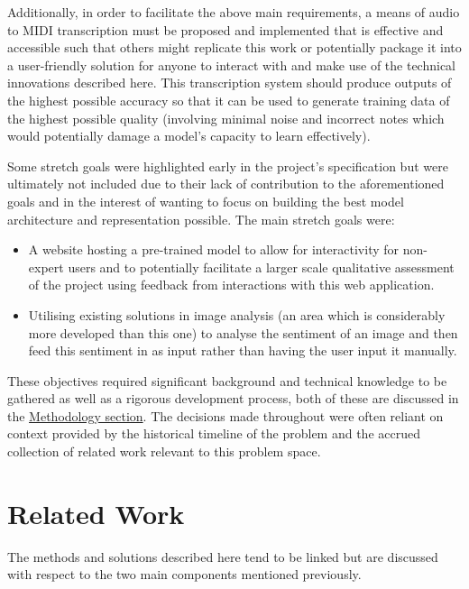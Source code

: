 \documentclass[12pt,]{article}
\providecommand{\tightlist}{%
  \setlength{\itemsep}{0pt}\setlength{\parskip}{0pt}}
\begin{document}
Additionally, in order to facilitate the above main requirements, a
means of audio to MIDI transcription must be proposed and implemented
that is effective and accessible such that others might replicate this
work or potentially package it into a user-friendly solution for anyone
to interact with and make use of the technical innovations described
here. This transcription system should produce outputs of the highest
possible accuracy so that it can be used to generate training data of
the highest possible quality (involving minimal noise and incorrect
notes which would potentially damage a model's capacity to learn
effectively).

Some stretch goals were highlighted early in the project's specification
but were ultimately not included due to their lack of contribution to
the aforementioned goals and in the interest of wanting to focus on
building the best model architecture and representation possible. The
main stretch goals were:

\begin{itemize}
\tightlist
\item
  A website hosting a pre-trained model to allow for interactivity for
  non-expert users and to potentially facilitate a larger scale
  qualitative assessment of the project using feedback from interactions
  with this web application.
\item
  Utilising existing solutions in image analysis (an area which is
  considerably more developed than this one) to analyse the sentiment of
  an image and then feed this sentiment in as input rather than having
  the user input it manually.
\end{itemize}

These objectives required significant background and technical knowledge
to be gathered as well as a rigorous development process, both of these
are discussed in the \protect\hyperlink{methodology}{Methodology
section}. The decisions made throughout were often reliant on context
provided by the historical timeline of the problem and the accrued
collection of related work relevant to this problem space.

\hypertarget{related-work}{%
\section{Related Work}\label{related-work}}

The methods and solutions described here tend to be linked but are
discussed with respect to the two main components mentioned previously.
\end{document}
